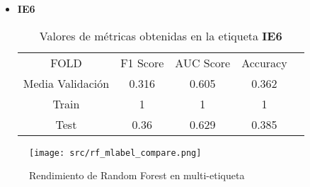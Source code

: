 \begin{itemize}
\begin{table}[H]
	      \end{table}
	\item  \textbf{IE6}
	      \begin{table}[H]
		      \centering
		      \begin{tabular}{|c|c|c|c|c}
			      \cline{1-4}
			      FOLD             & F1 Score & AUC Score & Accuracy \\ \cline{1-4}
			      Media Validación & 0.316    & 0.605     & 0.362    \\ \cline{1-4}
			      Train            & 1        & 1         & 1        \\ \cline{1-4}
			      Test             & 0.36     & 0.629     & 0.385    \\ \cline{1-4}
		      \end{tabular}
		      \caption{Valores de métricas obtenidas en la etiqueta \textbf{IE6}}
	      \end{table}
\end{itemize}

\begin{figure}[H]
	\centering
	\texttt{[image: src/rf\_mlabel\_compare.png]}
	\caption{Rendimiento de Random Forest en multi-etiqueta}
	\label{fig:rfml_cmp}
\end{figure}
